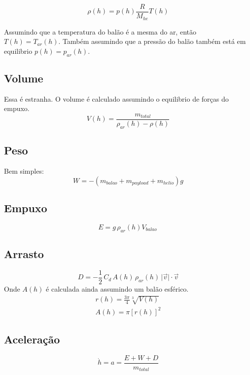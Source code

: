 \documentclass[a4paper, 12pt]{article}
\begin{document}
\begin{equation}
  \rho (h) = p(h) \frac{R}{M_{he}}T(h)
\end{equation}

Assumindo que a temperatura do balão é a mesma do ar, então $T(h) = T_{ar}(h)$.
Também assumindo que a pressão do balão também está em equilibrio $p(h) = p_{ar}(h)$.

\subsection {Volume}
Essa é estranha. O volume é calculado assumindo o equilibrio de forças do
empuxo.
\begin{equation}
  V(h) =  \frac{m_{total}}{\rho_{ar}(h) - \rho(h)}
\end{equation}

\subsection {Peso}
Bem simples:
\begin{equation}
  W = -\left( m_{balao} + m_{payload} + m_{helio} \right) g
\end{equation}

\subsection {Empuxo}
\begin{equation}
  E = g \, \rho_{ar}(h) V_{balao} \,
\end{equation}
\subsection {Arrasto}
\begin{equation}
  D = -\frac{1}{2} \, C_d \, A(h) \, \rho_{ar}(h) \,  \lvert \vec{v} \rvert \cdot \vec{v}
\end{equation}
Onde $A(h)$ é calculada ainda assumindo um balão esférico.
\begin{gather}
  r(h) = \frac{3\pi}{4} \sqrt[3]{V(h)} \\
  A(h) = \pi \left[r(h)\right]^2
\end{gather}
\subsection {Aceleração}
\begin{equation}
  \dot h = a = \frac{E + W + D}{m_{total}}
\end{equation}
\end{document}
